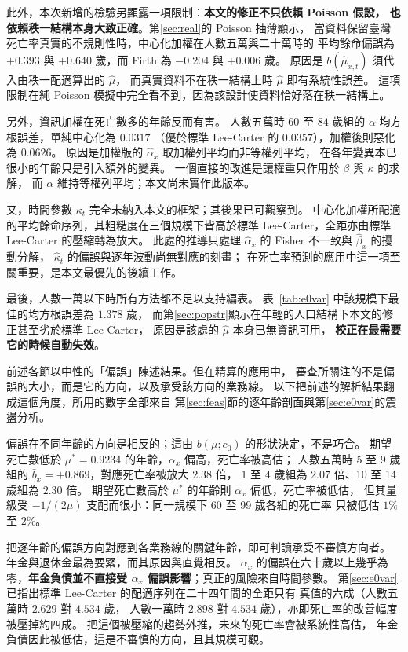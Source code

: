 \documentclass[UTF8, fontset=macnew, a4paper, 12pt]{ctexart}
\begin{document}
此外，本次新增的檢驗另顯露一項限制：\textbf{本文的修正不只依賴 Poisson 假設，
也依賴秩一結構本身大致正確}。第\ref{sec:real}的 Poisson 抽薄顯示，
當資料保留臺灣死亡率真實的不規則性時，中心化加權在人數五萬與二十萬時的
平均餘命偏誤為 $+0.393$ 與 $+0.640$ 歲，而 Firth 為 $-0.204$ 與 $+0.006$ 歲。
原因是 $b(\hat\mu_{x,t})$ 須代入由秩一配適算出的 $\hat\mu$，
而真實資料不在秩一結構上時 $\hat\mu$ 即有系統性誤差。
這項限制在純 Poisson 模擬中完全看不到，因為該設計使資料恰好落在秩一結構上。

另外，資訊加權在死亡數多的年齡反而有害。
人數五萬時 $60$ 至 $84$ 歲組的 $\alpha$ 均方根誤差，單純中心化為 $0.0317$
（優於標準 Lee-Carter 的 $0.0357$），加權後則惡化為 $0.0626$。
原因是加權版的 $\hat\alpha_x$ 取加權列平均而非等權列平均，
在各年變異本已很小的年齡只是引入額外的變異。
一個直接的改進是讓權重只作用於 $\beta$ 與 $\kappa$ 的求解，
而 $\alpha$ 維持等權列平均；本文尚未實作此版本。

又，時間參數 $\kappa_t$ 完全未納入本文的框架；其後果已可觀察到。
中心化加權所配適的平均餘命序列，其粗糙度在三個規模下皆高於標準
Lee-Carter，全距亦由標準 Lee-Carter 的壓縮轉為放大。
此處的推導只處理 $\hat\alpha_x$ 的 Fisher 不一致與 $\hat\beta_x$ 的擾動分解，
$\hat\kappa_t$ 的偏誤與逐年波動尚無對應的刻畫；
在死亡率預測的應用中這一項至關重要，是本文最優先的後續工作。

最後，人數一萬以下時所有方法都不足以支持編表。
表~\ref{tab:e0var} 中該規模下最佳的均方根誤差為 $1.378$ 歲，
而第\ref{sec:popstr}顯示在年輕的人口結構下本文的修正甚至劣於標準 Lee-Carter，
原因是該處的 $\hat\mu$ 本身已無資訊可用，
\textbf{校正在最需要它的時候自動失效}。



前述各節以中性的「偏誤」陳述結果。但在精算的應用中，
審查所關注的不是偏誤的大小，而是它的方向，以及承受該方向的業務線。
以下把前述的解析結果翻成這個角度，所用的數字全部來自
第\ref{sec:feas}節的逐年齡剖面與第\ref{sec:e0var}的震盪分析。

偏誤在不同年齡的方向是相反的；這由 $b(\mu;c_0)$ 的形狀決定，不是巧合。
期望死亡數低於 $\mu^{\ast}=0.9234$ 的年齡，$\alpha_x$ 偏高，死亡率被高估；
人數五萬時 5 至 9 歲組的 $\bar b_x=+0.869$，對應死亡率被放大 $2.38$ 倍，
1 至 4 歲組為 $2.07$ 倍、10 至 14 歲組為 $2.30$ 倍。
期望死亡數高於 $\mu^{\ast}$ 的年齡則 $\alpha_x$ 偏低，死亡率被低估，
但其量級受 $-1/(2\mu)$ 支配而很小：同一規模下 60 至 99 歲各組的死亡率
只被低估 $1\%$ 至 $2\%$。

把逐年齡的偏誤方向對應到各業務線的關鍵年齡，即可判讀承受不審慎方向者。
年金與退休金最為要緊，而其原因與直覺相反。
$\alpha_x$ 的偏誤在六十歲以上幾乎為零，\textbf{年金負債並不直接受
$\alpha_x$ 偏誤影響}；真正的風險來自時間參數。
第\ref{sec:e0var}已指出標準 Lee-Carter 的配適序列在二十四年間的全距只有
真值的六成（人數五萬時 $2.629$ 對 $4.534$ 歲，
人數一萬時 $2.898$ 對 $4.534$ 歲），亦即死亡率的改善幅度被壓掉約四成。
把這個被壓縮的趨勢外推，未來的死亡率會被系統性高估，
年金負債因此被低估，這是不審慎的方向，且其規模可觀。
\end{document}
